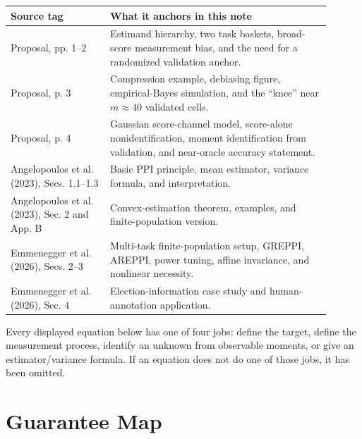 \documentclass[11pt]{article}
\begin{document}
\begin{center}
\begin{tabular}{>{\raggedright\arraybackslash}p{0.28\linewidth}p{0.62\linewidth}}
\toprule
Source tag & What it anchors in this note \\
\midrule
Proposal, pp. 1--2 & Estimand hierarchy, two task baskets, broad-score measurement bias, and the need for a randomized validation anchor. \\
Proposal, p. 3 & Compression example, debiasing figure, empirical-Bayes simulation, and the ``knee'' near $m\approx 40$ validated cells. \\
Proposal, p. 4 & Gaussian score-channel model, score-alone nonidentification, moment identification from validation, and near-oracle accuracy statement. \\
Angelopoulos et al. (2023), Secs. 1.1--1.3 & Basic PPI principle, mean estimator, variance formula, and interpretation. \\
Angelopoulos et al. (2023), Sec. 2 and App. B & Convex-estimation theorem, examples, and finite-population version. \\
Emmenegger et al. (2026), Secs. 2--3 & Multi-task finite-population setup, GREPPI, AREPPI, power tuning, affine invariance, and nonlinear necessity. \\
Emmenegger et al. (2026), Sec. 4 & Election-information case study and human-annotation application. \\
\bottomrule
\end{tabular}
\end{center}

Every displayed equation below has one of four jobs: define the target, define the measurement process, identify an unknown from observable moments, or give an estimator/variance formula. If an equation does not do one of those jobs, it has been omitted.

\section*{Guarantee Map}
\end{document}
